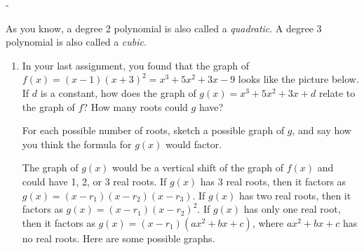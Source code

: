 \documentclass{article}
\makeatletter
\newlength{\tipmargin}
\renewenvironment{framed}{
  \setlength{\tipmargin}{\textwidth-\linewidth}
  \advance\@totalleftmargin-\tipmargin
  \def\FrameCommand{\hspace{\tipmargin}\fbox}%
  \advance\linewidth\tipmargin
  \MakeFramed {\advance\hsize-\width \FrameRestore}%
}
{\endMakeFramed}
\makeatother
\begin{document}
\begin{framed}
  As you know, a degree 2 polynomial is also called a \emph{quadratic}. A degree 3 polynomial is also called a \emph{cubic}.
\end{framed}

\begin{enumerate}[resume, topsep=0pt]
\item  \label{graph-cubic-with-repeated-root-followup}


  \begin{problem}[\newpage]
    In your last assignment, you found that the graph of $f(x) = (x-1)(x+3)^2 = x^3 + 5x^2 + 3x - 9$ looks like the picture below. If $d$ is a constant, how does the graph of $g(x) = x^3 + 5x^2 + 3x + d$ relate to the graph of $f$? How many roots could $g$ have?

    For each possible number of roots, sketch a possible graph of $g$, and say how you think the formula for $g(x)$ would factor.


  \end{problem}

  \begin{solution}
    The graph of $g(x)$ would be a vertical shift of the graph of
    $f(x)$ and could have 1, 2, or 3 real roots. If $g(x)$ has 3
    real roots, then it factors as $g(x)=(x-r_1)(x-r_2)(x-r_3)$. If
    $g(x)$ has two real roots, then it factors as $g(x)=(x-r_1)(x-r_2)^2$.
    If $g(x)$ has only one real root, then it factors as $g(x)=(x-r_1)(ax^2+bx+c)$, where $ax^2+bx+c$ has no real roots. Here are some
    possible graphs.
    \begin{center}
    \end{center}
    

\end{solution}
\end{enumerate}
\end{document}
